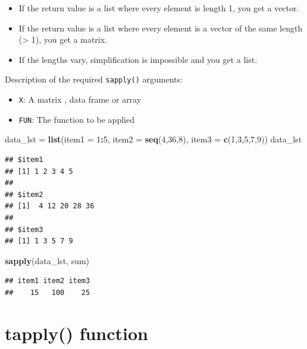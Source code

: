 \documentclass[
]{book}
\newenvironment{Shaded}{\begin{snugshade}}{\end{snugshade}}
\newcommand{\DataTypeTok}[1]{\textcolor[rgb]{0.13,0.29,0.53}{#1}}
\newcommand{\DecValTok}[1]{\textcolor[rgb]{0.00,0.00,0.81}{#1}}
\newcommand{\KeywordTok}[1]{\textcolor[rgb]{0.13,0.29,0.53}{\textbf{#1}}}
\newcommand{\NormalTok}[1]{#1}
\newcommand{\OperatorTok}[1]{\textcolor[rgb]{0.81,0.36,0.00}{\textbf{#1}}}
\newcommand{\StringTok}[1]{\textcolor[rgb]{0.31,0.60,0.02}{#1}}
\providecommand{\tightlist}{%
  \setlength{\itemsep}{0pt}\setlength{\parskip}{0pt}}
\begin{document}
\begin{itemize}
\item
  If the return value is a list where every element is length 1, you get a vector.
\item
  If the return value is a list where every element is a vector of the same length (\textgreater{} 1), you get a matrix.
\item
  If the lengths vary, simplification is impossible and you get a list.
\end{itemize}

Description of the required \texttt{sapply()} arguments:

\begin{itemize}
\tightlist
\item
  \texttt{X}: A matrix , data frame or array
\item
  \texttt{FUN}: The function to be applied
\end{itemize}

\begin{Shaded}
\begin{Highlighting}[]
\NormalTok{data_lst =}\StringTok{ }\KeywordTok{list}\NormalTok{(}\DataTypeTok{item1 =} \DecValTok{1}\OperatorTok{:}\DecValTok{5}\NormalTok{,}
                 \DataTypeTok{item2 =} \KeywordTok{seq}\NormalTok{(}\DecValTok{4}\NormalTok{,}\DecValTok{36}\NormalTok{,}\DecValTok{8}\NormalTok{),}
                 \DataTypeTok{item3 =} \KeywordTok{c}\NormalTok{(}\DecValTok{1}\NormalTok{,}\DecValTok{3}\NormalTok{,}\DecValTok{5}\NormalTok{,}\DecValTok{7}\NormalTok{,}\DecValTok{9}\NormalTok{))}
\NormalTok{data_lst}
\end{Highlighting}
\end{Shaded}

\begin{verbatim}
## $item1
## [1] 1 2 3 4 5
## 
## $item2
## [1]  4 12 20 28 36
## 
## $item3
## [1] 1 3 5 7 9
\end{verbatim}

\begin{Shaded}
\begin{Highlighting}[]
\KeywordTok{sapply}\NormalTok{(data_lst, sum)}
\end{Highlighting}
\end{Shaded}

\begin{verbatim}
## item1 item2 item3 
##    15   100    25
\end{verbatim}

\hypertarget{tapply-function}{%
\section{tapply() function}\label{tapply-function}}
\end{document}
